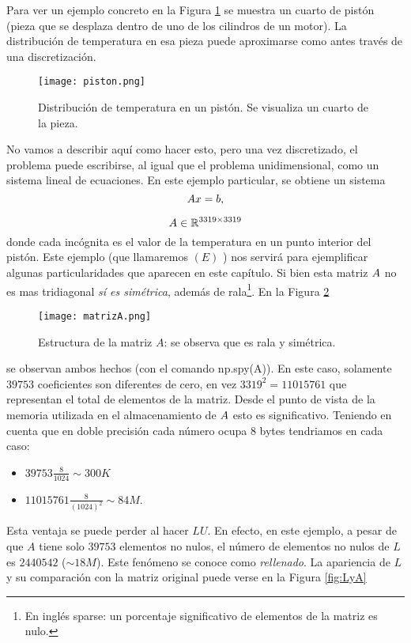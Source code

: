Para ver un ejemplo concreto en la Figura \ref{fig:disc_piston} se muestra un cuarto de pistón (pieza que se desplaza dentro de uno de los cilindros de un motor). La distribución de temperatura en esa pieza puede aproximarse como antes  través de una discretización.
\begin{figure}[h]
\centering\texttt{[image: piston.png]}
\label{fig:disc_piston}
\caption{Distribución de temperatura en un pistón. Se visualiza un cuarto de la pieza.}
\end{figure}
No vamos a describir aquí como hacer esto, pero una vez discretizado, el problema puede escribirse, al igual que el problema unidimensional, como un sistema lineal de ecuaciones. En este ejemplo particular, se obtiene un sistema
 $$
 \Ab\xb=\bb,
 $$

 $$\Ab\in \R^{3319\times 3319}$$
donde cada incógnita es el valor de la temperatura en un punto interior del pistón. Este ejemplo (que llamaremos $(E)$ ) nos servirá para ejemplificar algunas particularidades que aparecen en este capítulo. Si bien esta matriz $\Ab$ no es mas tridiagonal \emph{sí es simétrica}, además de  rala\footnote{ En inglés sparse: un porcentaje significativo de elementos de la matriz es nulo.}. En la Figura \ref{fig:matrizA}
\begin{figure}[h]
\label{fig:matrizA}
\centering\texttt{[image: matrizA.png]}
\caption{Estructura de la matriz $A$: se observa que es rala y simétrica.}
\end{figure}
se observan ambos hechos (con el comando np.spy(A)). En este caso, solamente $39753$ coeficientes son diferentes de cero, en vez $3319^2=11015761$ que representan el total de elementos de la matriz. Desde  el punto de vista de la memoria utilizada en el almacenamiento de $\Ab$ esto es significativo. Teniendo en cuenta que en doble precisión cada número ocupa 8 bytes tendriamos en cada caso:
\begin{itemize}
 \item $39753\frac{8}{1024}\sim 300K$
 \item $11015761 \frac{8}{(1024)^2}\sim 84M$.
\end{itemize}
Esta ventaja se puede perder al hacer $LU$.
En efecto, en este ejemplo, a pesar de que $A$ tiene solo $39753$ elementos no nulos, el número de elementos no nulos de $L$ es $2440542$ ($\sim 18M$). Este fenómeno se conoce como \emph{rellenado}. La apariencia de $L$ y su comparación con la matriz original puede verse en la Figura \ref{fig:LyA}

